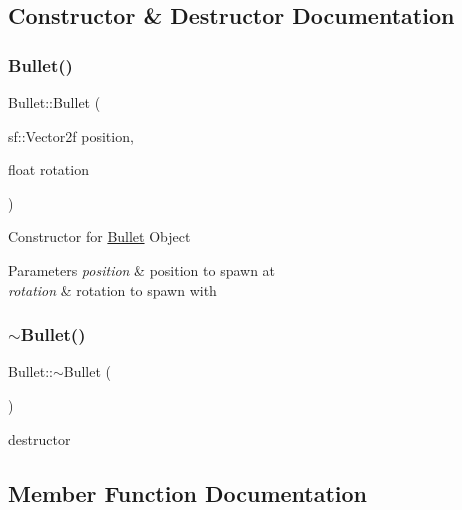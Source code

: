 \subsection{Constructor \& Destructor Documentation}
\mbox{\label{class_bullet_aaa125020f55e7d86e6c46212f412f15d}} 
\subsubsection{\texorpdfstring{Bullet()}{Bullet()}}
{\footnotesize\ttfamily Bullet\+::\+Bullet (\begin{DoxyParamCaption}\item[{sf\+::\+Vector2f}]{position,  }\item[{float}]{rotation }\end{DoxyParamCaption})}



Constructor for \mbox{\hyperlink{class_bullet}{Bullet}} Object 


\begin{DoxyParams}{Parameters}
{\em position} & position to spawn at\\
\hline
{\em rotation} & rotation to spawn with\\
\hline
\end{DoxyParams}
\mbox{\label{class_bullet_aaeb5cb41d7db89f49007b08b41f1bfcf}} 
\subsubsection{\texorpdfstring{$\sim$Bullet()}{~Bullet()}}
{\footnotesize\ttfamily Bullet\+::$\sim$\+Bullet (\begin{DoxyParamCaption}{ }\end{DoxyParamCaption})}



destructor 



\subsection{Member Function Documentation}
\mbox{\label{class_bullet_aa128a7449171a208a057a73a19ec2837}} 
